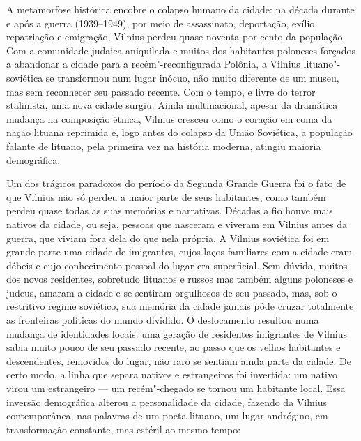 %

A metamorfose histórica encobre o colapso humano da cidade: na década
durante e após a guerra (1939--1949), por meio de assassinato,
deportação, exílio, repatriação e emigração, Vilnius perdeu quase
noventa por cento da população. Com a comunidade judaica aniquilada e
muitos dos habitantes poloneses forçados a abandonar a cidade para a
recém"-reconfigurada Polônia, a Vilnius lituano"-soviética se transformou
num lugar inócuo, não muito diferente de um museu, mas sem reconhecer
seu passado recente. Com o tempo, e livre do terror stalinista, uma nova
cidade surgiu. Ainda multinacional, apesar da dramática mudança na
composição étnica, Vilnius cresceu como o coração em coma da nação
lituana reprimida e, logo antes do colapso da União Soviética, a
população falante de lituano, pela primeira vez na história moderna,
atingiu maioria demográfica.

Um dos trágicos paradoxos do período da Segunda Grande Guerra foi o fato
de que Vilnius não só perdeu a maior parte de seus habitantes, como
também perdeu quase todas as suas memórias e narrativas. Décadas a fio
houve mais nativos da cidade, ou seja, pessoas que nasceram e viveram em
Vilnius antes da guerra, que viviam fora dela do que nela própria. A
Vilnius soviética foi em grande parte uma cidade de imigrantes, cujos
laços familiares com a cidade eram débeis e cujo conhecimento pessoal do
lugar era superficial. Sem dúvida, muitos dos novos residentes,
sobretudo lituanos e russos mas também alguns poloneses e judeus, amaram
a cidade e se sentiram orgulhosos de seu passado, mas, sob o restritivo
regime soviético, sua memória da cidade jamais pôde cruzar totalmente as
fronteiras políticas do mundo dividido. O deslocamento resultou numa
mudança de identidades locais: uma geração de residentes imigrantes de
Vilnius sabia muito pouco de seu passado recente, ao passo que os velhos
habitantes e descendentes, removidos do lugar, não raro se sentiam ainda
parte da cidade. De certo modo, a linha que separa nativos e
estrangeiros foi invertida: um nativo virou um estrangeiro --- um
recém"-chegado se tornou um habitante local. Essa inversão demográfica
alterou a personalidade da cidade, fazendo da Vilnius contemporânea, nas
palavras de um poeta lituano, um lugar andrógino, em transformação
constante, mas estéril ao mesmo tempo:

